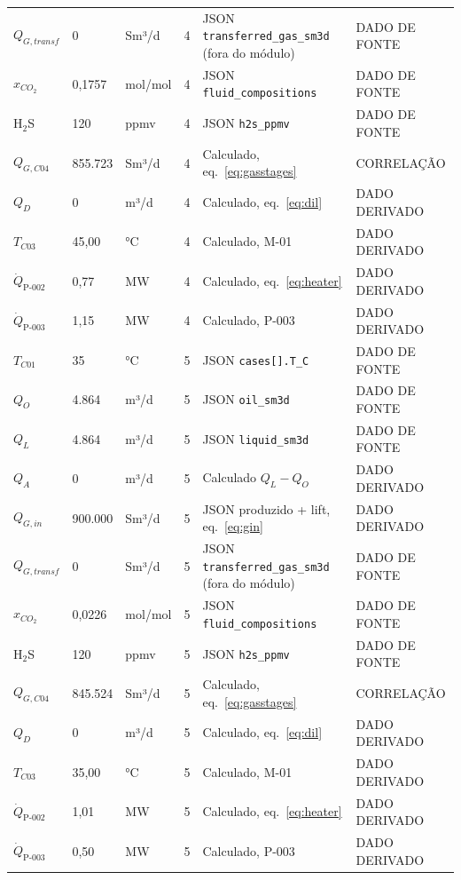 \documentclass[11pt,a4paper]{article}
\numberwithin{equation}{section}
\numberwithin{table}{section}
\numberwithin{figure}{section}
\newcommand{\tipo}[1]{\textsf{\footnotesize #1}}
\begin{document}
{\begin{longtable}{L{3.6cm}L{2.2cm}lL{1.0cm}L{4.2cm}l}
$Q_{G,transf}$ & 0 & Sm³/d & 4 & JSON \texttt{transferred\_gas\_sm3d} (fora do módulo) & \tipo{DADO DE FONTE}\\
$x_{CO_2}$ & 0{,}1757 & mol/mol & 4 & JSON \texttt{fluid\_compositions} & \tipo{DADO DE FONTE}\\
H$_2$S & 120 & ppmv & 4 & JSON \texttt{h2s\_ppmv} & \tipo{DADO DE FONTE}\\
$Q_{G,C04}$ & 855.723 & Sm³/d & 4 & Calculado, eq.~\eqref{eq:gasstages} & \tipo{CORRELAÇÃO}\\
$Q_{D}$ & 0 & m³/d & 4 & Calculado, eq.~\eqref{eq:dil} & \tipo{DADO DERIVADO}\\
$T_{C03}$ & 45,00 & °C & 4 & Calculado, M-01 & \tipo{DADO DERIVADO}\\
$\dot Q_{\mbox{P-002}}$ & 0,77 & MW & 4 & Calculado, eq.~\eqref{eq:heater} & \tipo{DADO DERIVADO}\\
$\dot Q_{\mbox{P-003}}$ & 1,15 & MW & 4 & Calculado, P-003 & \tipo{DADO DERIVADO}\\
$T_{C01}$ & 35 & °C & 5 & JSON \texttt{cases[].T\_C} & \tipo{DADO DE FONTE}\\
$Q_{O}$ & 4.864 & m³/d & 5 & JSON \texttt{oil\_sm3d} & \tipo{DADO DE FONTE}\\
$Q_{L}$ & 4.864 & m³/d & 5 & JSON \texttt{liquid\_sm3d} & \tipo{DADO DE FONTE}\\
$Q_{A}$ & 0 & m³/d & 5 & Calculado $Q_L-Q_O$ & \tipo{DADO DERIVADO}\\
$Q_{G,in}$ & 900.000 & Sm³/d & 5 & JSON produzido + lift, eq.~\eqref{eq:gin} & \tipo{DADO DERIVADO}\\
$Q_{G,transf}$ & 0 & Sm³/d & 5 & JSON \texttt{transferred\_gas\_sm3d} (fora do módulo) & \tipo{DADO DE FONTE}\\
$x_{CO_2}$ & 0{,}0226 & mol/mol & 5 & JSON \texttt{fluid\_compositions} & \tipo{DADO DE FONTE}\\
H$_2$S & 120 & ppmv & 5 & JSON \texttt{h2s\_ppmv} & \tipo{DADO DE FONTE}\\
$Q_{G,C04}$ & 845.524 & Sm³/d & 5 & Calculado, eq.~\eqref{eq:gasstages} & \tipo{CORRELAÇÃO}\\
$Q_{D}$ & 0 & m³/d & 5 & Calculado, eq.~\eqref{eq:dil} & \tipo{DADO DERIVADO}\\
$T_{C03}$ & 35,00 & °C & 5 & Calculado, M-01 & \tipo{DADO DERIVADO}\\
$\dot Q_{\mbox{P-002}}$ & 1,01 & MW & 5 & Calculado, eq.~\eqref{eq:heater} & \tipo{DADO DERIVADO}\\
$\dot Q_{\mbox{P-003}}$ & 0,50 & MW & 5 & Calculado, P-003 & \tipo{DADO DERIVADO}\\

\end{longtable}}
\end{document}
